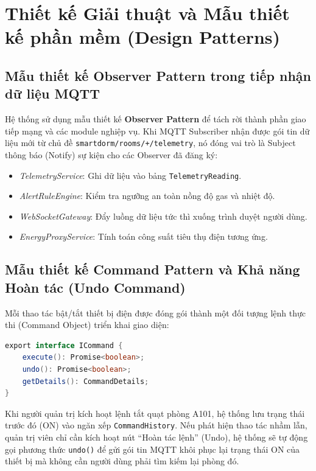 \section{Thiết kế Giải thuật và Mẫu thiết kế phần mềm (Design Patterns)}
\label{sec:design_patterns}

\subsection{Mẫu thiết kế Observer Pattern trong tiếp nhận dữ liệu MQTT}
Hệ thống sử dụng mẫu thiết kế \textbf{Observer Pattern} để tách rời thành phần giao tiếp mạng và các module nghiệp vụ. Khi MQTT Subscriber nhận được gói tin dữ liệu mới từ chủ đề \texttt{smartdorm/rooms/+/telemetry}, nó đóng vai trò là Subject thông báo (Notify) sự kiện cho các Observer đã đăng ký:
\begin{itemize}
    \item \textit{TelemetryService}: Ghi dữ liệu vào bảng \texttt{TelemetryReading}.
    \item \textit{AlertRuleEngine}: Kiểm tra ngưỡng an toàn nồng độ gas và nhiệt độ.
    \item \textit{WebSocketGateway}: Đẩy luồng dữ liệu tức thì xuống trình duyệt người dùng.
    \item \textit{EnergyProxyService}: Tính toán công suất tiêu thụ điện tương ứng.
\end{itemize}

\subsection{Mẫu thiết kế Command Pattern và Khả năng Hoàn tác (Undo Command)}
Mỗi thao tác bật/tắt thiết bị điện được đóng gói thành một đối tượng lệnh thực thi (Command Object) triển khai giao diện:
\begin{lstlisting}[language=Java, caption={Đặc tả giao diện Command trong NestJS}]
export interface ICommand {
    execute(): Promise<boolean>;
    undo(): Promise<boolean>;
    getDetails(): CommandDetails;
}
\end{lstlisting}
Khi người quản trị kích hoạt lệnh tắt quạt phòng A101, hệ thống lưu trạng thái trước đó (ON) vào ngăn xếp \texttt{CommandHistory}. Nếu phát hiện thao tác nhầm lẫn, quản trị viên chỉ cần kích hoạt nút ``Hoàn tác lệnh'' (Undo), hệ thống sẽ tự động gọi phương thức \texttt{undo()} để gửi gói tin MQTT khôi phục lại trạng thái ON của thiết bị mà không cần người dùng phải tìm kiếm lại phòng đó.

